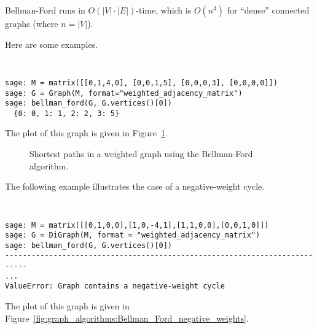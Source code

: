 Bellman-Ford runs in $O(|V|\cdot |E|)$-time, which is $O(n^3)$ for 
``dense'' connected graphs (where $n=|V|$).

Here are some examples.

\begin{center}
\fontsize{9pt}{9pt}
\selectfont
\tt
\begin{lstlisting}
sage: M = matrix([[0,1,4,0], [0,0,1,5], [0,0,0,3], [0,0,0,0]])
sage: G = Graph(M, format="weighted_adjacency_matrix")
sage: bellman_ford(G, G.vertices()[0])
  {0: 0, 1: 1, 2: 2, 3: 5}
\end{lstlisting}
\end{center}
%
The plot of this graph is given in
Figure~\ref{fig:graph_algorithms:Bellman_Ford_example}.

\begin{figure}[!htbp]
\centering
{}
\caption{Shortest paths in a weighted graph using the Bellman-Ford
  algorithm.}
\label{fig:graph_algorithms:Bellman_Ford_example}
\end{figure}

The following example illustrates the case of a negative-weight cycle.

\begin{center}
\fontsize{9pt}{9pt}
\selectfont
\tt
\begin{lstlisting}
sage: M = matrix([[0,1,0,0],[1,0,-4,1],[1,1,0,0],[0,0,1,0]])
sage: G = DiGraph(M, format = "weighted_adjacency_matrix")
sage: bellman_ford(G, G.vertices()[0])
---------------------------------------------------------------------------
...
ValueError: Graph contains a negative-weight cycle
\end{lstlisting}
\end{center}
%
The plot of this graph is given in
Figure~\ref{fig:graph_algorithms:Bellman_Ford_negative_weights}.


